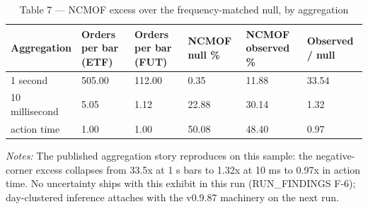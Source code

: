 \begin{table}[htbp]\centering
\caption{Table 7 — NCMOF excess over the frequency-matched null, by aggregation}
\label{tab:t3}
\small
\begin{tabular}{llllll}
\toprule
Aggregation & Orders per bar (ETF) & Orders per bar (FUT) & NCMOF null \% & NCMOF observed \% & Observed / null \\
\midrule
1 second & 505.00 & 112.00 & 0.35 & 11.88 & 33.54 \\
10 millisecond & 5.05 & 1.12 & 22.88 & 30.14 & 1.32 \\
action time & 1.00 & 1.00 & 50.08 & 48.40 & 0.97 \\
\bottomrule
\end{tabular}
\begin{minipage}{\linewidth}\vspace{2pt}\footnotesize\emph{Notes:} The published aggregation story reproduces on this sample: the negative-corner excess collapses from 33.5x at 1 s bars to 1.32x at 10 ms to 0.97x in action time. No uncertainty ships with this exhibit in this run (RUN\_FINDINGS F-6); day-clustered inference attaches with the v0.9.87 machinery on the next run.\end{minipage}
\end{table}
